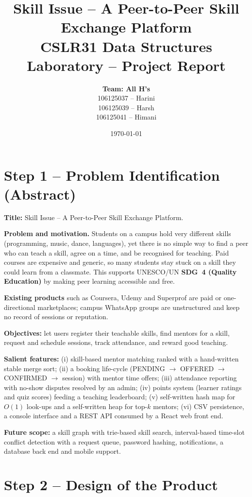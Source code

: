 \documentclass[11pt,a4paper]{article}
\title{\textbf{Skill Issue -- A Peer-to-Peer Skill Exchange Platform}\\[2pt]
\large CSLR31 Data Structures Laboratory -- Project Report}
\author{\textbf{Team: All H's}\\[4pt] 106125037 -- Harini\\ 106125039 -- Harsh\\ 106125041 -- Himani}
\date{\today}
\begin{document}
\maketitle
\tableofcontents
\newpage

\section{Step 1 -- Problem Identification (Abstract)}

\textbf{Title:} Skill Issue -- A Peer-to-Peer Skill Exchange Platform.

\noindent\textbf{Problem and motivation.} Students on a campus hold very different skills (programming, music, dance, languages), yet there is no simple way to find a peer who can teach a skill, agree on a time, and be recognised for teaching. Paid courses are expensive and generic, so many students stay stuck on a skill they could learn from a classmate. This supports UNESCO/UN \textbf{SDG~4 (Quality Education)} by making peer learning accessible and free.

\textbf{Existing products} such as Coursera, Udemy and Superprof are paid or one-directional marketplaces; campus WhatsApp groups are unstructured and keep no record of sessions or reputation.

\textbf{Objectives:} let users register their teachable skills, find mentors for a skill, request and schedule sessions, track attendance, and reward good teaching.

\textbf{Salient features:} (i) skill-based mentor matching ranked with a hand-written stable merge sort; (ii) a booking life-cycle (PENDING $\rightarrow$ OFFERED $\rightarrow$ CONFIRMED $\rightarrow$ session) with mentor time offers; (iii) attendance reporting with no-show disputes resolved by an admin; (iv) points system (learner ratings and quiz scores) feeding a teaching leaderboard; (v) self-written hash map for $O(1)$ look-ups and a self-written heap for top-$k$ mentors; (vi) CSV persistence, a console interface and a REST API consumed by a React web front end.

\textbf{Future scope:} a skill graph with trie-based skill search, interval-based time-slot conflict detection with a request queue, password hashing, notifications, a database back end and mobile support.

\section{Step 2 -- Design of the Product}
\end{document}
